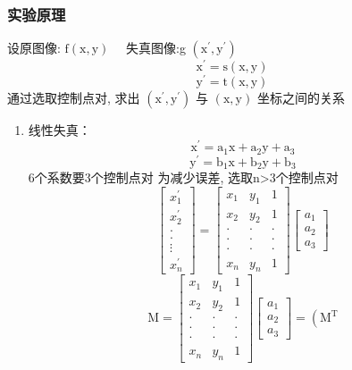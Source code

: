 \documentclass{ctexart}
\begin{document}
\subsubsection{\hei 实验原理}
设原图像: $\mathrm{f}(\mathrm{x}, \mathrm{y}) \quad$ 失真图像:g $\left(\mathrm{x}^{\prime}, \mathrm{y}^{\prime}\right)$
$$\mathrm{x}^{\prime}=\mathrm{s}(\mathrm{x}, \mathrm{y})$$
$$\mathrm{y}^{\prime}=\mathrm{t}(\mathrm{x}, \mathrm{y})$$
通过选取控制点对, 求出 $\left(\mathrm{x}^{\prime}, \mathrm{y}^{\prime}\right)$ 与 $(\mathrm{x}, \mathrm{y})$ 坐标之间的关系
\begin{enumerate}\item  线性失真： $$\mathrm{x}^{\prime}=\mathrm{a}_{1} \mathrm{x}+\mathrm{a}_{2} \mathrm{y}+\mathrm{a}_{3}$$
          $$\mathrm{y}^{\prime}=\mathrm{b}_{1} \mathrm{x}+\mathrm{b}_{2} \mathrm{y}+\mathrm{b}_{3}$$
          6个系数要3个控制点对 为减少误差, 选取n>3个控制点对
          $$\left[\begin{array}{c}x_{1}^{\prime} \\ x_{2}^{\prime} \\ . \\ . \\ \vdots \\ x_{n}^{\prime}\end{array}\right]=\left[\begin{array}{rrr}x_{1} & y_{1} & 1 \\ x_{2} & y_{2} & 1 \\ \cdot & \cdot & \cdot \\ \cdot & \cdot & \cdot \\ \cdot & \cdot & \cdot \\ x_{n} & y_{n} & 1\end{array}\right]\left[\begin{array}{l}a_{1} \\ a_{2} \\ a_{3}\end{array}\right]$$
          $$\mathrm{M}=\left[\begin{array}{ccc}x_{1} & y_{1} & 1 \\ x_{2} & y_{2} & 1 \\ \cdot & \cdot
                                 & \cdot     \\ \cdot & \cdot & \cdot \\ \cdot & \cdot & \cdot \\ x_{n} & y_{n} & 1\end{array}
                  \right]\left[\begin{array}{l}a_{1} \\ a_{2} \\ a_{3}\end{array}\right]=\left(\mathrm{M}^{\mathrm{T}}
$$
\end{enumerate}
\end{document}

